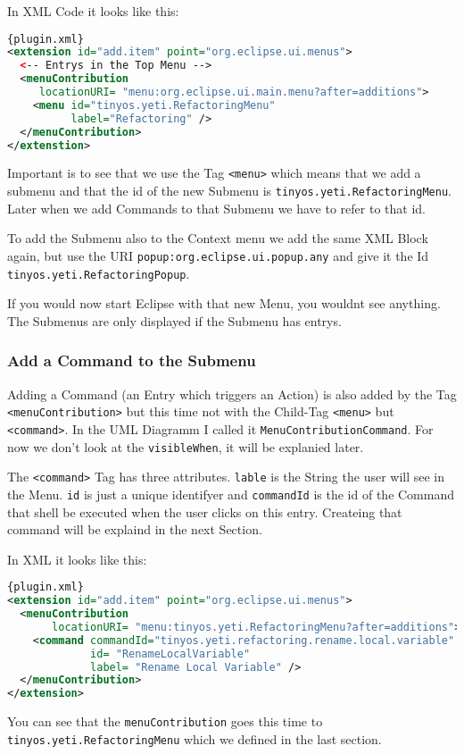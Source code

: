 \documentclass[a4paper,10pt]{report}
\begin{document}
In XML Code it looks like this:
\begin{lstlisting}[language=XML,caption=Create Menu Folder ({\it plugin.xml})]{plugin.xml}
<extension id="add.item" point="org.eclipse.ui.menus">
  <-- Entrys in the Top Menu -->
  <menuContribution
     locationURI= "menu:org.eclipse.ui.main.menu?after=additions">
    <menu id="tinyos.yeti.RefactoringMenu"
          label="Refactoring" />
  </menuContribution>
</extenstion>
\end{lstlisting}
Important is to see that we use the Tag \verb!<menu>! which means that we add a submenu and that the id of the new Submenu is \verb!tinyos.yeti.RefactoringMenu!. 
Later when we add Commands to that Submenu we have to refer to that id.

To add the Submenu also to the Context menu we add the same XML Block again, but use the URI \verb!popup:org.eclipse.ui.popup.any! and give it the Id \verb!tinyos.yeti.RefactoringPopup!.

If you would now start Eclipse with that new Menu, you wouldnt see anything. The Submenus are only displayed if the Submenu has entrys.
\subsubsection{Add a Command to the Submenu}
Adding a Command (an Entry which triggers an Action) is also added by the Tag \verb!<menuContribution>! but this time not with the Child-Tag \verb!<menu>! but \verb!<command>!.
In the UML Diagramm I called it \verb!MenuContributionCommand!. For now we don't look at the \verb!visibleWhen!, it will be explanied later.

The \verb!<command>! Tag has three attributes. \verb!lable! is the String the user will see in the Menu. \verb!id! is just a unique identifyer and \verb!commandId! is the 
id of the Command that shell be executed when the user clicks on this entry. Createing that command will be explaind in the next Section.

In XML it looks like this:
\begin{lstlisting}[language=XML,caption=Create Menu Folder ({\it plugin.xml})]{plugin.xml}
<extension id="add.item" point="org.eclipse.ui.menus">
  <menuContribution
       locationURI= "menu:tinyos.yeti.RefactoringMenu?after=additions">
    <command commandId="tinyos.yeti.refactoring.rename.local.variable"
             id= "RenameLocalVariable"
             label= "Rename Local Variable" />
  </menuContribution>
</extension>
\end{lstlisting}
You can see that the \verb!menuContribution! goes this time to \verb!tinyos.yeti.RefactoringMenu! which we defined in the last section.
\end{document}

